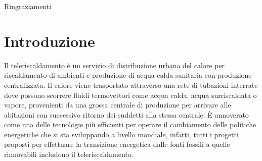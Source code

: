 \documentclass[laurea,oneside,11pt]{USiena_tesiLM}
\newcommand{\facciatabianca}{\newpage\shipout\null\stepcounter{page}}
\begin{document}
\begin{frontespizio}
\Sottotitolo {}
\Margini {3cm}{2cm}{3cm}{2cm}
\end{frontespizio}

\facciatabianca


%
%
\begin{abstract}          %
  
\end{abstract}             %

\frontmatter
Ringraziamenti            %
\
%
\tableofcontents            %
%


\mainmatter

\chapter*{Introduzione}

Il teleriscaldamento è un  servizio  di  distribuzione  urbana  del calore per  riscaldamento di ambienti e produzione di acqua calda sanitaria con produzione centralizzata. Il calore viene trasportato attraverso una rete di tubazioni interrate dove possono scorrere  fluidi termovettori come acqua calda, acqua surriscaldata o vapore, provenienti da una grossa centrale di produzione per arrivare alle abitazioni con successivo ritorno dei suddetti alla stessa centrale. È annoverato come una delle tecnologie più efficienti per operare il cambiamento delle politiche energetiche che si sta sviluppando a livello mondiale, infatti, tutti i progetti proposti per effettuare la transizione energetica dalle fonti fossili a quelle rinnovabili includono il teleriscaldamento. 
\end{document}
